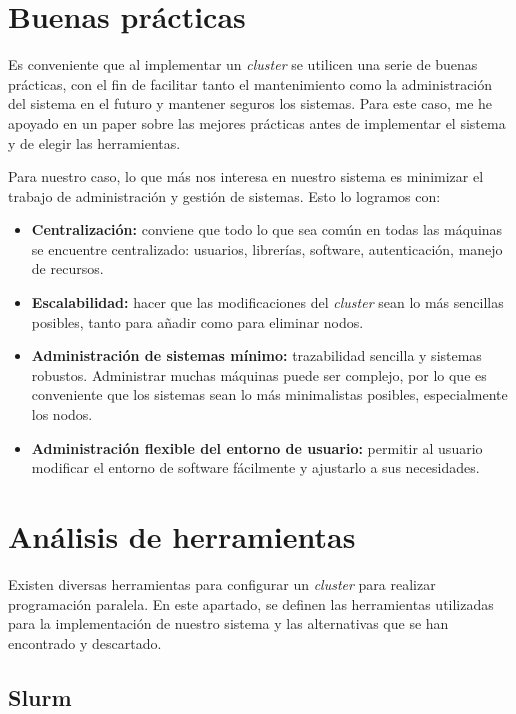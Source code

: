 \section{Buenas prácticas}

Es conveniente que al implementar un \emph{cluster} se utilicen una serie de buenas prácticas, con el fin de facilitar tanto el mantenimiento como la administración del sistema en el futuro y mantener seguros los sistemas. Para este caso, me he apoyado en un paper sobre las mejores prácticas antes de implementar el sistema \cite{6114480} y de elegir las herramientas.
\vspace{2mm}

Para nuestro caso, lo que más nos interesa en nuestro sistema es minimizar el trabajo de administración y gestión de sistemas. Esto lo logramos con:

\begin{itemize}
    \item \textbf{Centralización: } conviene que todo lo que sea común en todas las máquinas se encuentre centralizado: usuarios, librerías, software, autenticación, manejo de recursos.
    \item \textbf{Escalabilidad: } hacer que las modificaciones del \emph{cluster} sean lo más sencillas posibles, tanto para añadir como para eliminar nodos. 
    \item \textbf{Administración de sistemas mínimo: } trazabilidad sencilla y sistemas robustos. Administrar muchas máquinas puede ser complejo, por lo que es conveniente que los sistemas sean lo más minimalistas posibles, especialmente los nodos.
    \item \textbf{Administración flexible del entorno de usuario: } permitir al usuario modificar el entorno de software fácilmente y ajustarlo a sus necesidades.
\end{itemize}



\section{Análisis de herramientas}

Existen diversas herramientas para configurar un \emph{cluster} para realizar programación paralela. En este apartado, se definen las herramientas utilizadas para la implementación de nuestro sistema y las alternativas que se han encontrado y descartado.

\subsection{Slurm}

